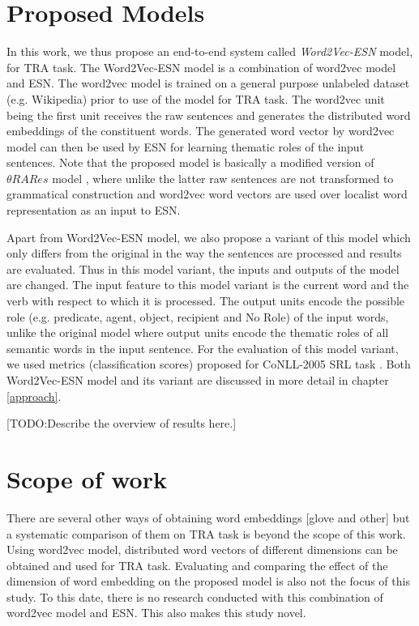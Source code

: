 \section{Proposed Models}

In this work, we thus propose an end-to-end system called \textit{Word2Vec-ESN} model, for TRA task. The Word2Vec-ESN model is a combination of word2vec model and ESN. The word2vec model is trained on a general purpose unlabeled dataset (e.g. Wikipedia) prior to use of the model for TRA task. The word2vec unit being the first unit receives the raw sentences and generates the distributed word embeddings of the constituent words. The generated word vector by word2vec model can then be used by ESN for learning thematic roles of the input sentences. Note that the proposed model is basically a modified version of $\theta RARes$ model \cite{xavier:2013:RT}, where unlike the latter raw sentences are not transformed to grammatical construction and word2vec word vectors are used over localist word representation as an input to ESN. 

Apart from Word2Vec-ESN model, we also propose a variant of this model which only differs from the original in the way the sentences are processed and results are evaluated. Thus in this model variant, the inputs and outputs of the model are changed. The input feature to this model variant is the current word and the verb with respect to which it is processed. The output units encode the possible role (e.g. predicate, agent, object, recipient and No Role) of the input words, unlike the original model where output units encode the thematic roles of all semantic words in the input sentence. For the evaluation of this model variant, we used metrics (classification scores) proposed for CoNLL-2005 SRL task \cite{conll:2005,conll:2004}. Both Word2Vec-ESN model and its variant are discussed in more detail in chapter \ref{approach}.

[TODO:Describe the overview of results here.]

\section{Scope of work}

There are several other ways of obtaining word embeddings [glove and other] but a systematic comparison of them on TRA task is beyond the scope of this work. Using word2vec model, distributed word vectors of different dimensions can be obtained and used for TRA task. Evaluating and comparing the effect of the dimension of  word embedding on the proposed model is also not the focus of this study. To this date, there is no research conducted with this combination of word2vec model and ESN. This also makes this study novel.

